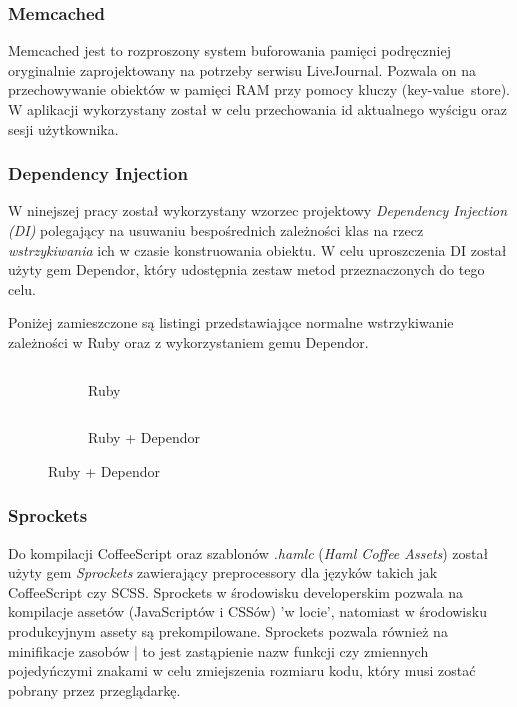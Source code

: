 \documentclass[11pt,a4paper, twoside]{article}
\begin{document}
\subsubsection{Memcached}
Memcached jest to rozproszony system buforowania pamięci podręczniej oryginalnie zaprojektowany na potrzeby serwisu  LiveJournal. Pozwala on na przechowywanie obiektów w pamięci RAM przy pomocy kluczy \mbox{(key-value store)}. W aplikacji wykorzystany został w celu przechowania id aktualnego wyścigu oraz sesji użytkownika.
\subsubsection{Dependency Injection}
W ninejszej pracy został wykorzystany wzorzec projektowy \emph{Dependency Injection (DI)} polegający na usuwaniu bespośrednich zależności klas na rzecz \emph{wstrzykiwania} ich w czasie konstruowania obiektu. W celu uproszczenia  DI został użyty gem Dependor, który udostępnia zestaw metod przeznaczonych do tego celu.

Poniżej zamieszczone są listingi przedstawiające normalne wstrzykiwanie zależności w Ruby oraz z wykorzystaniem gemu Dependor.
\newline


\begin{figure}[H]
\centering
\begin{subfigure}[t]{0.45\textwidth}
\caption{Ruby}
\begin{listing}[H]
\inputminted[linenos=true]{ruby}{./src/di_ruby.rb}
\end{listing}
\end{subfigure}
\begin{subfigure}[t]{0.45\textwidth}
\caption{Ruby + Dependor}
\begin{listing}[H]
\inputminted{ruby}{./src/di_dependor.rb}
\end{listing}
\end{subfigure}
\end{figure}
\subsubsection{Sprockets}
Do kompilacji CoffeeScript oraz szablonów \emph{.hamlc} (\emph{Haml Coffee Assets}) został użyty gem \emph{Sprockets} zawierający preprocessory dla języków takich jak CoffeeScript czy SCSS. Sprockets w środowisku developerskim pozwala na kompilacje assetów (JavaScriptów i CSSów) 'w locie', natomiast w środowisku produkcyjnym assety są prekompilowane. Sprockets pozwala również na minifikacje zasobów | to jest zastąpienie nazw funkcji czy zmiennych pojedyńczymi znakami w celu zmiejszenia rozmiaru kodu, który musi zostać pobrany przez przeglądarkę. 
\end{document}
